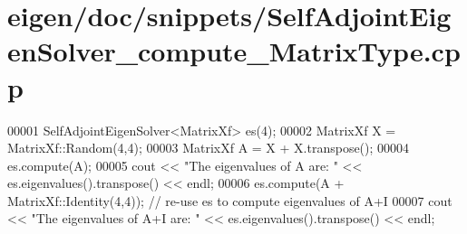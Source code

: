 \hypertarget{eigen_2doc_2snippets_2_self_adjoint_eigen_solver__compute___matrix_type_8cpp_source}{}\section{eigen/doc/snippets/\+Self\+Adjoint\+Eigen\+Solver\+\_\+compute\+\_\+\+Matrix\+Type.cpp}
\label{eigen_2doc_2snippets_2_self_adjoint_eigen_solver__compute___matrix_type_8cpp_source}

\begin{DoxyCode}
00001 SelfAdjointEigenSolver<MatrixXf> es(4);
00002 MatrixXf X = MatrixXf::Random(4,4);
00003 MatrixXf A = X + X.transpose();
00004 es.compute(A);
00005 cout << \textcolor{stringliteral}{"The eigenvalues of A are: "} << es.eigenvalues().transpose() << endl;
00006 es.compute(A + MatrixXf::Identity(4,4)); \textcolor{comment}{// re-use es to compute eigenvalues of A+I}
00007 cout << \textcolor{stringliteral}{"The eigenvalues of A+I are: "} << es.eigenvalues().transpose() << endl;
\end{DoxyCode}
